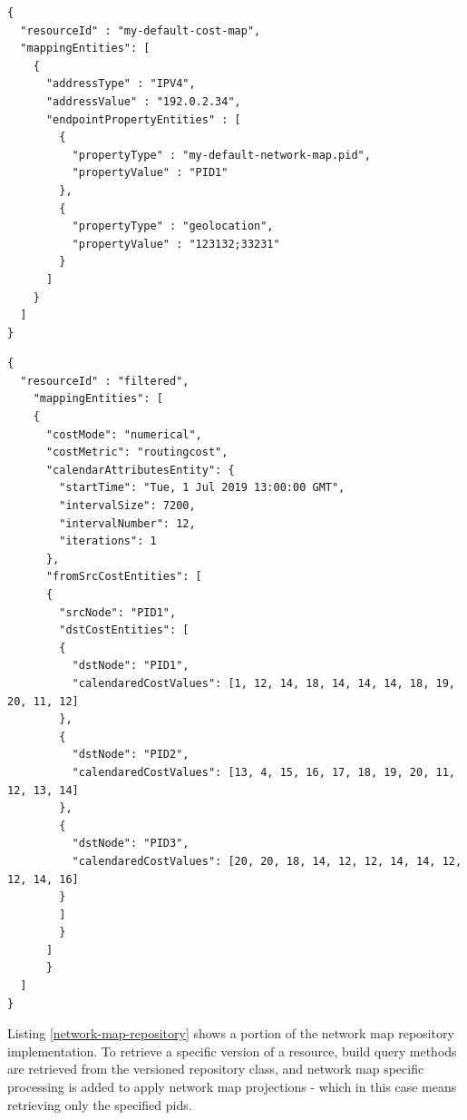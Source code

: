 \begin{center}
\begin{minipage}[t]{.43\textwidth}
\begin{lstlisting}[frame=lrbt, basicstyle=\tiny]
{
  "resourceId" : "my-default-cost-map",
  "mappingEntities": [
    {
      "addressType" : "IPV4",
      "addressValue" : "192.0.2.34",
      "endpointPropertyEntities" : [
        {
          "propertyType" : "my-default-network-map.pid",
          "propertyValue" : "PID1"
        },
        {
          "propertyType" : "geolocation",
          "propertyValue" : "123132;33231"
        }
      ]
    }
  ]
}
\end{lstlisting}
\end{minipage}\hfill
\begin{minipage}[t]{.54\textwidth}
\begin{lstlisting}[frame=lrbt, basicstyle=\tiny]
{
  "resourceId" : "filtered",
    "mappingEntities": [
    {
      "costMode": "numerical",
      "costMetric": "routingcost",
      "calendarAttributesEntity": {
        "startTime": "Tue, 1 Jul 2019 13:00:00 GMT",
        "intervalSize": 7200,
        "intervalNumber": 12,
        "iterations": 1
      },
      "fromSrcCostEntities": [
      {
        "srcNode": "PID1",
        "dstCostEntities": [
        {
          "dstNode": "PID1",
          "calendaredCostValues": [1, 12, 14, 18, 14, 14, 14, 18, 19, 20, 11, 12]
        },
        {
          "dstNode": "PID2",
          "calendaredCostValues": [13, 4, 15, 16, 17, 18, 19, 20, 11, 12, 13, 14]
        },
        {
          "dstNode": "PID3",
          "calendaredCostValues": [20, 20, 18, 14, 12, 12, 14, 14, 12, 12, 14, 16]
        }
        ]
        }
      ]
      }
  ]
}
\end{lstlisting}
\end{minipage}
\label{lst:costmap-vs-endpoint-prop}
\end{center}

    Listing \ref{network-map-repository} shows a portion of the network map repository implementation.
    To retrieve a specific version of a resource, build query methods are retrieved from the versioned repository class, and network map specific processing is added to apply network map projections - which in this case means retrieving only the specified \glspl{pid}.


